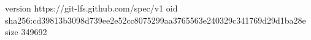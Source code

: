version https://git-lfs.github.com/spec/v1
oid sha256:cd39813b3098d739ee2e52cc8075299aa3765563e240329c341769d29d1ba28e
size 349692
